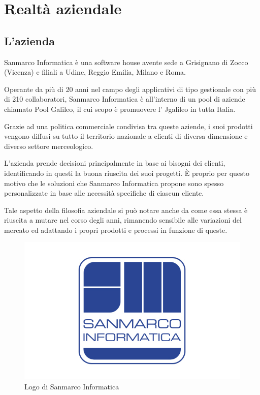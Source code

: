 
\chapter{Realtà aziendale}
\label{cap:realta}


\section{L'azienda}

Sanmarco Informatica è una software house avente sede a Grisignano di Zocco
(Vicenza) e filiali a Udine, Reggio Emilia, Milano e Roma.

Operante da più di 20 anni nel campo degli applicativi di tipo gestionale con
più di 210 collaboratori, Sanmarco Informatica è all'interno di un pool di
aziende chiamato Pool Galileo, il cui scopo è promuovere l'
Jgalileo in tutta Italia.

Grazie ad una politica commerciale condivisa tra queste aziende, i suoi
prodotti vengono diffusi su tutto il territorio nazionale a clienti di diversa
dimensione e diverso settore merceologico.

L'azienda prende decisioni principalmente in base ai bisogni dei clienti,
identificando in questi la buona riuscita dei suoi progetti. È proprio per
questo motivo che le soluzioni che Sanmarco Informatica propone sono spesso
personalizzate in base alle necessità specifiche di ciascun cliente.

Tale aspetto della filosofia aziendale si può notare anche da come essa stessa
è riuscita a mutare nel corso degli anni, rimanendo sensibile alle variazioni
del mercato ed adattando i propri prodotti e processi in funzione di queste.

\begin{figure}[H]%
\centering
\includegraphics[width=.5\columnwidth]{immagini/logo-sanmarco.jpg}
\caption{Logo di Sanmarco Informatica}%
\label{fig:logo-smi}%
\end{figure}

